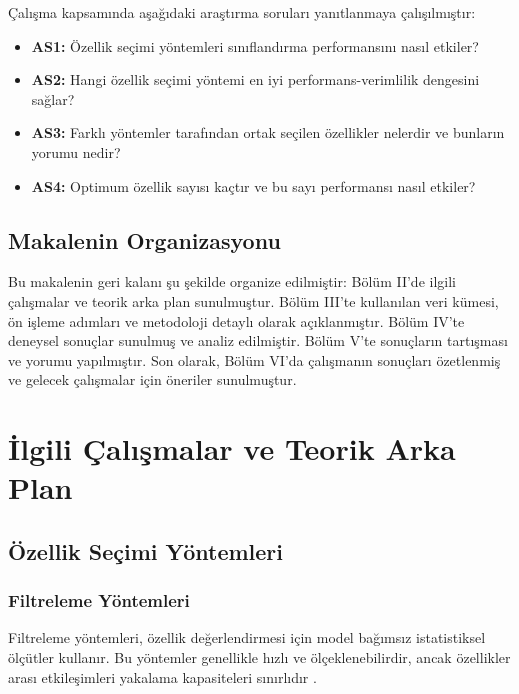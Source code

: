 \documentclass[conference]{IEEEtran}
\begin{document}
Çalışma kapsamında aşağıdaki araştırma soruları yanıtlanmaya çalışılmıştır:

\begin{itemize}
    \item \textbf{AS1:} Özellik seçimi yöntemleri sınıflandırma performansını nasıl etkiler?
    \item \textbf{AS2:} Hangi özellik seçimi yöntemi en iyi performans-verimlilik dengesini sağlar?
    \item \textbf{AS3:} Farklı yöntemler tarafından ortak seçilen özellikler nelerdir ve bunların yorumu nedir?
    \item \textbf{AS4:} Optimum özellik sayısı kaçtır ve bu sayı performansı nasıl etkiler?
\end{itemize}

\subsection{Makalenin Organizasyonu}

Bu makalenin geri kalanı şu şekilde organize edilmiştir: Bölüm II'de ilgili çalışmalar ve teorik arka plan sunulmuştur. Bölüm III'te kullanılan veri kümesi, ön işleme adımları ve metodoloji detaylı olarak açıklanmıştır. Bölüm IV'te deneysel sonuçlar sunulmuş ve analiz edilmiştir. Bölüm V'te sonuçların tartışması ve yorumu yapılmıştır. Son olarak, Bölüm VI'da çalışmanın sonuçları özetlenmiş ve gelecek çalışmalar için öneriler sunulmuştur.

\section{İlgili Çalışmalar ve Teorik Arka Plan}

\subsection{Özellik Seçimi Yöntemleri}

\subsubsection{Filtreleme Yöntemleri}

Filtreleme yöntemleri, özellik değerlendirmesi için model bağımsız istatistiksel ölçütler kullanır. Bu yöntemler genellikle hızlı ve ölçeklenebilirdir, ancak özellikler arası etkileşimleri yakalama kapasiteleri sınırlıdır \cite{guyon2003introduction}.
\end{document}
